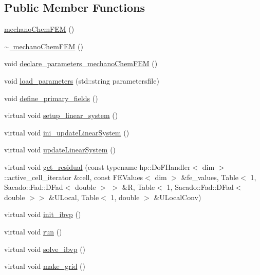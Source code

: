 \subsection*{Public Member Functions}
\begin{DoxyCompactItemize}
\item 
\mbox{\hyperlink{classmechano_chem_f_e_m_ae86e36350c9dd3aef65944d2e926311a}{mechano\+Chem\+F\+EM}} ()
\item 
\mbox{\hyperlink{classmechano_chem_f_e_m_a6ac6ffa723cf5e22f90dc80fa5e77ff6}{$\sim$ mechano\+Chem\+F\+EM}} ()
\item 
void \mbox{\hyperlink{classmechano_chem_f_e_m_aa745c884c3343abacbffa4669a72488d}{declare\+\_\+parameters\+\_\+mechano\+Chem\+F\+EM}} ()
\item 
void \mbox{\hyperlink{classmechano_chem_f_e_m_a5d2215a9bdbd1f1726f1e9c2182d2072}{load\+\_\+parameters}} (std\+::string parametersfile)
\item 
void \mbox{\hyperlink{classmechano_chem_f_e_m_a3d9afee26426f7a184185dba31a2d138}{define\+\_\+primary\+\_\+fields}} ()
\item 
virtual void \mbox{\hyperlink{classmechano_chem_f_e_m_a082302fff160a5e5535e6647af388389}{setup\+\_\+linear\+\_\+system}} ()
\item 
virtual void \mbox{\hyperlink{classmechano_chem_f_e_m_a295e0565636db5e7b8d22639182de706}{ini\+\_\+update\+Linear\+System}} ()
\item 
virtual void \mbox{\hyperlink{classmechano_chem_f_e_m_af78c2c6284234c93872188334fb997d8}{update\+Linear\+System}} ()
\item 
virtual void \mbox{\hyperlink{classmechano_chem_f_e_m_ac8f2c3e2a1040c70b709900dc3dfdaea}{get\+\_\+residual}} (const typename hp\+::\+Do\+F\+Handler$<$ dim $>$\+::active\+\_\+cell\+\_\+iterator \&cell, const F\+E\+Values$<$ dim $>$ \&fe\+\_\+values, Table$<$ 1, Sacado\+::\+Fad\+::\+D\+Fad$<$ double $>$ $>$ \&R, Table$<$ 1, Sacado\+::\+Fad\+::\+D\+Fad$<$ double $>$$>$ \&U\+Local, Table$<$ 1, double $>$ \&U\+Local\+Conv)
\item 
virtual void \mbox{\hyperlink{classmechano_chem_f_e_m_ad01ab2c3347ff55e8787624a97732182}{init\+\_\+ibvp}} ()
\item 
virtual void \mbox{\hyperlink{classmechano_chem_f_e_m_a13a43e6d814de94978c515cb084873b1}{run}} ()
\item 
virtual void \mbox{\hyperlink{classmechano_chem_f_e_m_a856108deee592fc9dde678b60a9b6596}{solve\+\_\+ibvp}} ()
\item 
virtual void \mbox{\hyperlink{classmechano_chem_f_e_m_aadd4943e52767516f3f7c5460ea35032}{make\+\_\+grid}} ()
$$
\end{DoxyCompactItemize}

